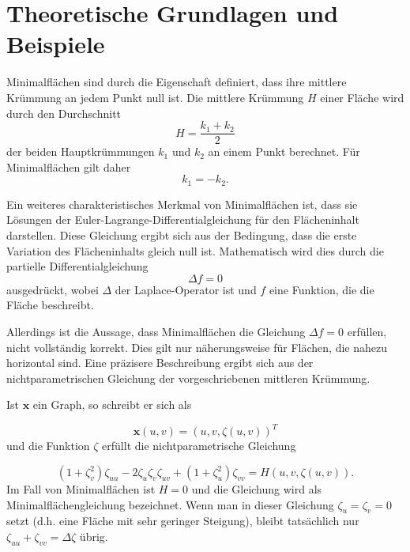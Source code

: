 %
%
%
%
\section{Theoretische Grundlagen und Beispiele
	\label{minimalflaechen:section:Theoretische Grundlagen und Beispiele}}
Minimalflächen sind durch die Eigenschaft definiert, dass ihre mittlere Krümmung an jedem Punkt null ist.
Die mittlere Krümmung $H$ einer Fläche wird durch den Durchschnitt
%
\begin{equation}
	H=\frac{k_{1}+k_{2}}{2}
\end{equation}
%
der beiden Hauptkrümmungen $k_1$ und $k_2$ an einem Punkt berechnet.
Für Minimalflächen gilt daher
%
\begin{equation}
	k_{1}=-k_{2}.
\end{equation}

Ein weiteres charakteristisches Merkmal von Minimalflächen ist, dass sie Lösungen der Euler-Lagrange-Differentialgleichung für den Flächeninhalt darstellen.
Diese Gleichung ergibt sich aus der Bedingung, dass die erste Variation des Flächeninhalts gleich null ist.
Mathematisch wird dies durch die partielle Differentialgleichung
%
\begin{equation}
	\Delta f = 0
\end{equation}
%
ausgedrückt, wobei $\Delta$ der Laplace-Operator ist und $f$ eine Funktion, die die Fläche beschreibt.

Allerdings ist die Aussage, dass Minimalflächen die Gleichung \(\Delta f = 0\) erfüllen, nicht vollständig korrekt.
Dies gilt nur näherungsweise für Flächen, die nahezu horizontal sind.
Eine präzisere Beschreibung ergibt sich aus der nichtparametrischen Gleichung der vorgeschriebenen mittleren Krümmung.

Ist \(\mathbf{x}\) ein Graph, so schreibt er sich als

\begin{equation}
\mathbf{x}(u,v) = (u,v,\zeta(u,v))^{T}
\end{equation}
%
und die Funktion \(\zeta\) erfüllt die nichtparametrische Gleichung

\begin{equation}
(1 + \zeta_{v}^{2})\zeta_{uu} - 2\zeta_{u}\zeta_{v}\zeta_{uv} + (1 + \zeta_{u}^{2})\zeta_{vv} = H(u,v,\zeta(u,v)).
\end{equation}
%
Im Fall von Minimalflächen ist \(H = 0\) und die Gleichung wird als Minimalflächengleichung bezeichnet.
Wenn man in dieser Gleichung \(\zeta_u = \zeta_v = 0\) setzt (d.h. eine Fläche mit sehr geringer Steigung), bleibt tatsächlich nur \(\zeta_{uu} + \zeta_{vv} = \Delta \zeta\) übrig. 







